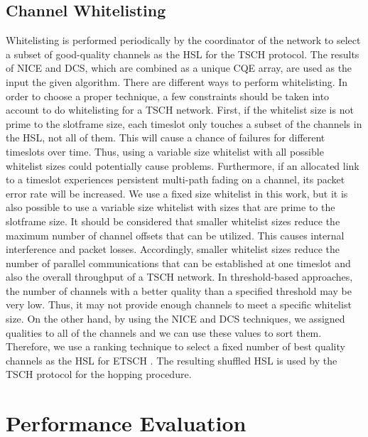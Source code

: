 \documentclass[acmsmall, authorversion]{acmart}
\begin{document}
\subsection{Channel Whitelisting}
Whitelisting is performed periodically by the coordinator of the network to select a subset of good-quality channels as the HSL for the TSCH protocol. The results of NICE and DCS, which are combined as a unique CQE array, are used as the input the given algorithm. There are different ways to perform whitelisting. In order to choose a proper technique, a few constraints should be taken into account to do whitelisting for a TSCH network. First, if the whitelist size is not prime to the slotframe size, each timeslot only touches a subset of the channels in the HSL, not all of them. This will cause a  chance of failures for different timeslots over time. Thus, using a variable size whitelist with all possible whitelist sizes could potentially cause problems. Furthermore, if an allocated link to a timeslot experiences persistent multi-path fading on a channel, its packet error rate will be increased. We use a fixed size whitelist in this work, but it is also possible to use a variable size whitelist with sizes that are prime to the slotframe size. It should be considered that smaller whitelist sizes reduce the maximum number of channel offsets that can be utilized. This causes internal interference and packet losses. Accordingly, smaller whitelist sizes reduce the number of parallel communications that can be established at one timeslot and also the overall throughput of a TSCH network. In threshold-based approaches, the number of channels with a better quality than a specified threshold may be very low. Thus, it may not provide enough channels to meet a specific whitelist size. On the other hand, by using the NICE and DCS techniques, we assigned qualities to all of the channels and we can use these values to sort them. Therefore, we use a ranking technique to select a fixed number of best quality channels as the HSL for ETSCH \cite{gomes}. The resulting shuffled HSL is used by the TSCH protocol for the hopping procedure.

\section{Performance Evaluation}
\end{document}
